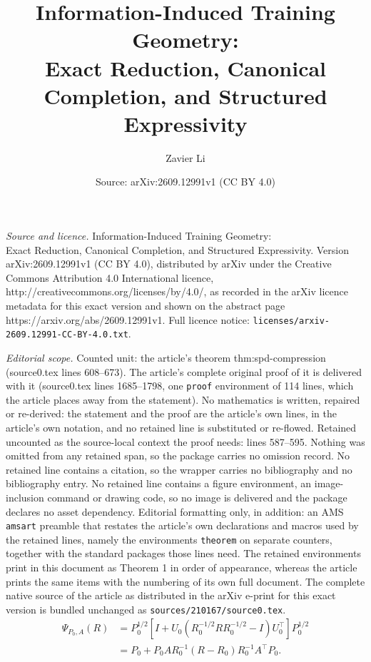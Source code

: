 \documentclass[10pt,a4paper]{amsart}
\title{Information-Induced Training Geometry:\\ Exact Reduction, Canonical Completion, and Structured Expressivity}
\author{Zavier Li}
\date{Source: arXiv:2609.12991v1 (CC BY 4.0)}
\begin{document}
\maketitle

\noindent\emph{Source and licence.} Information-Induced Training Geometry:\\ Exact Reduction, Canonical Completion, and Structured Expressivity. Version arXiv:2609.12991v1 (CC BY 4.0), distributed by arXiv under the Creative Commons Attribution 4.0 International licence, http://creativecommons.org/licenses/by/4.0/, as recorded in the arXiv licence metadata for this exact version and shown on the abstract page https://arxiv.org/abs/2609.12991v1. Full licence notice: \texttt{licenses/arxiv-2609.12991-CC-BY-4.0.txt}.\par\smallskip

\noindent\textit{Editorial scope.} Counted unit: the article's theorem thm:spd-compression (source0.tex lines 608--673). The article's complete original proof of it is delivered with it (source0.tex lines 1685--1798, one \texttt{proof} environment of 114 lines, which the article places away from the statement). No mathematics is written, repaired or re-derived: the statement and the proof are the article's own lines, in the article's own notation, and no retained line is substituted or re-flowed.  Retained uncounted as the source-local context the proof needs: lines 587--595.  Nothing was omitted from any retained span, so the package carries no omission record.  No retained line contains a citation, so the wrapper carries no bibliography and no bibliography entry.  No retained line contains a figure environment, an image-inclusion command or drawing code, so no image is delivered and the package declares no asset dependency.  Editorial formatting only, in addition: an AMS \texttt{amsart} preamble that restates the article's own declarations and macros used by the retained lines, namely the environments \texttt{theorem} on separate counters, together with the standard packages those lines need.  The retained environments print in this document as Theorem 1 in order of appearance, whereas the article prints the same items with the numbering of its own full document.  The complete native source of the article as distributed in the arXiv e-print for this exact version is bundled unchanged as \texttt{sources/210167/source0.tex}.
\begin{align}
  \Psi_{P_0,A}(R)
  &=P_0^{1/2}
  \left[I+U_0(R_0^{-1/2}RR_0^{-1/2}-I)U_0^\top\right]
  P_0^{1/2}
  \nonumber\\
  &=P_0+P_0AR_0^{-1}(R-R_0)R_0^{-1}A^\top P_0.
  \label{eq:canonical-completion}
\end{align}
\end{document}

